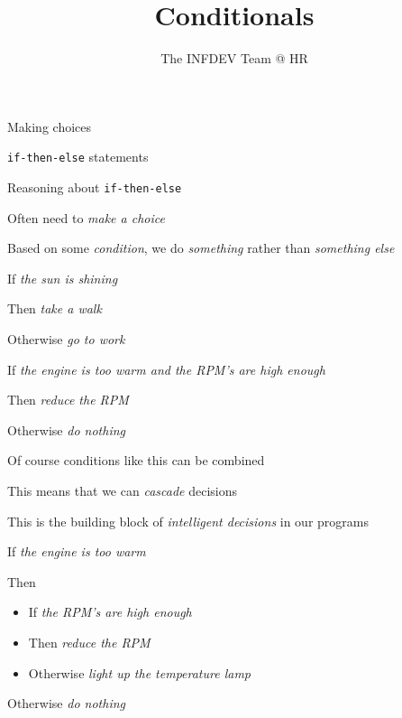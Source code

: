\documentclass{beamer}
\title{Conditionals}
\author{The INFDEV Team @ HR}
\institute{Hogeschool Rotterdam \\ 
Rotterdam, Netherlands}
\date{}
\begin{document}
\maketitle

\begin{slide}{
\item Making choices
\item \texttt{if-then-else} statements
\item Reasoning about \texttt{if-then-else}
}\end{slide}

\begin{slide}{
\item Often need to \textit{make a choice}
\item Based on some \textit{condition}, we do \textit{something} rather than \textit{something else}
}\end{slide}

\begin{slide}{
\item If \textit{the sun is shining}
\item Then \textit{take a walk}
\item Otherwise \textit{go to work}
}\end{slide}

\begin{slide}{
\item If \textit{the engine is too warm and the RPM's are high enough}
\item Then \textit{reduce the RPM}
\item Otherwise \textit{do nothing}
}\end{slide}

\begin{slide}{
\item Of course conditions like this can be combined
\item This means that we can \textit{cascade} decisions
\item This is the building block of \textit{intelligent decisions} in our programs
}\end{slide}

\begin{slide}{
\item If \textit{the engine is too warm}
\item Then
\begin{itemize}
\item If \textit{the RPM's are high enough}
\item Then \textit{reduce the RPM}
\item Otherwise \textit{light up the temperature lamp}
\end{itemize}
\item Otherwise \textit{do nothing}
}\end{slide}
\end{document}
